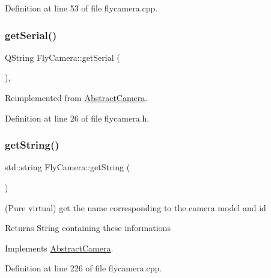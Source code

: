 Definition at line 53 of file flycamera.\+cpp.

\mbox{\label{class_fly_camera_a2f6857dd2270d473f3d4ecb590b5dcab}} 
\subsubsection{\texorpdfstring{getSerial()}{getSerial()}}
{\footnotesize\ttfamily Q\+String Fly\+Camera\+::get\+Serial (\begin{DoxyParamCaption}{ }\end{DoxyParamCaption})\hspace{0.3cm}{\ttfamily [inline]}, {\ttfamily [virtual]}}



Reimplemented from \mbox{\hyperlink{class_abstract_camera_a0dcd65fa3bcc83ba95ffdb0a9044a407}{Abstract\+Camera}}.



Definition at line 26 of file flycamera.\+h.

\mbox{\label{class_fly_camera_a97938fec7396d02574383f7db50d9e58}} 
\subsubsection{\texorpdfstring{getString()}{getString()}}
{\footnotesize\ttfamily std\+::string Fly\+Camera\+::get\+String (\begin{DoxyParamCaption}{ }\end{DoxyParamCaption})\hspace{0.3cm}{\ttfamily [virtual]}}



(Pure virtual) get the name corresponding to the camera model and id 

\begin{DoxyReturn}{Returns}
String containing these informations 
\end{DoxyReturn}


Implements \mbox{\hyperlink{class_abstract_camera_a75dc6b53d5a8717944d5e8ded9609611}{Abstract\+Camera}}.



Definition at line 226 of file flycamera.\+cpp.

\mbox{\label{class_fly_camera_a1c875e383a5a500a6a099a73fb3c54e3}} 
